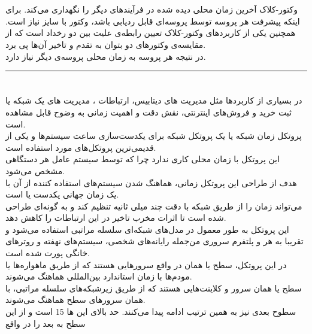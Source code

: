 \documentclass{article}
\begin{document}
\begin{multicols}{2}

\section{}
وکتور-کلاک آخرین زمان محلی دیده شده در فرآیندهای دیگر را نگهداری می‌کند. برای اینکه پیشرفت هر پروسه توسط پروسه‌ای قابل ردیابی باشد، وکتور با سایز
نیاز است.
همچنین یکی از کاربردهای وکتور-کلاک تعیین رابطه‌ی علیت بین دو رخداد است که از مقایسه‌ی وکتورهای دو
بتوان به تقدم و تاخیر آن‌ها پی برد.\\
در نتیجه هر پروسه به زمان محلی 
پروسه‌ی دیگر نیاز دارد.

\rule{\linewidth}{1pt}

\section{}
در بسیاری از کاربردها مثل مدیریت
های دیتابیس، ارتباطات
، مدیریت
های یک شبکه یا ثبت خرید و فروش‌های اینترنتی، نقش دقت و اهمیت زمانی به وضوح قابل مشاهده است.\\
پروتکل زمان شبکه یا
یک پروتکل شبکه برای یکدست‌سازی ساعت سیستم‌ها و یکی از قدیمی‌ترین پروتکل‌های مورد استفاده است.\\
این پروتکل با زمان محلی کاری ندارد چرا که
توسط سیستم عامل هر دستگاهی مشخص می‌شود.\\
هدف از طراحی این پروتکل زمانی، هماهنگ شدن سیستم‌های استفاده کننده از آن با یک زمان جهانی یکدست یا
است.\\
می‌تواند زمان را از طریق شبکه با دقت چند میلی ثانیه تنظیم کند و به گونه‌ای طراحی شده است تا اثرات مخرب تاخیر در این ارتباطات را کاهش دهد.\\
این پروتکل به طور معمول در مدل‌های شبکه‌ای سلسله مراتبی استفاده می‌شود و تقریبا به هر
و پلتفرم سروری من‌جمله رایانه‌های شخصی، سیستم‌های نهفته و روترهای خانگی پورت شده است.\\
در این پروتکل، سطح
یا همان
در واقع سرورهایی هستند که از طریق ماهواره‌ها یا مودم‌ها با زمان استاندارد بین‌المللی هماهنگ می‌شوند.\\
سطح
یا همان
سرور و کلاینت‌هایی هستند که از طریق زیرشبکه‌های سلسله مراتبی، با همان سرورهای سطح
هماهنگ می‌شوند.\\
سطوح بعدی نیز به همین ترتیب ادامه پیدا می‌کنند. حد بالای این
ها 15 است و از این سطح به بعد را در واقع

\end{multicols}
\end{document}
